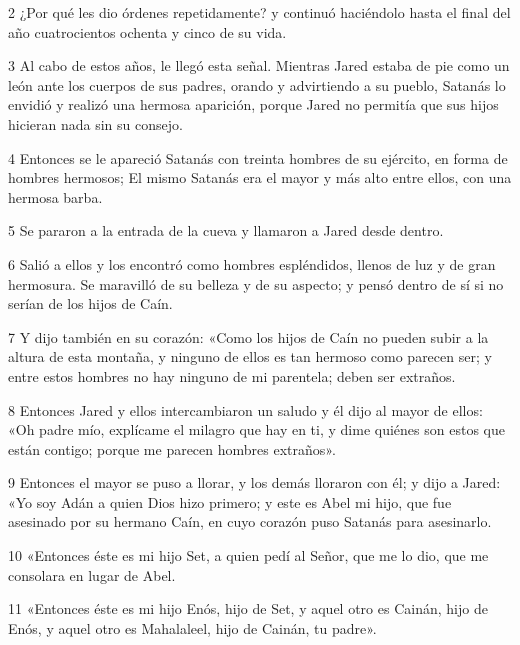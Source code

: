 \par 2 ¿Por qué les dio órdenes repetidamente? y continuó haciéndolo hasta el final del año cuatrocientos ochenta y cinco de su vida.

\par 3 Al cabo de estos años, le llegó esta señal. Mientras Jared estaba de pie como un león ante los cuerpos de sus padres, orando y advirtiendo a su pueblo, Satanás lo envidió y realizó una hermosa aparición, porque Jared no permitía que sus hijos hicieran nada sin su consejo.

\par 4 Entonces se le apareció Satanás con treinta hombres de su ejército, en forma de hombres hermosos; El mismo Satanás era el mayor y más alto entre ellos, con una hermosa barba.

\par 5 Se pararon a la entrada de la cueva y llamaron a Jared desde dentro.

\par 6 Salió a ellos y los encontró como hombres espléndidos, llenos de luz y de gran hermosura. Se maravilló de su belleza y de su aspecto; y pensó dentro de sí si no serían de los hijos de Caín.

\par 7 Y dijo también en su corazón: «Como los hijos de Caín no pueden subir a la altura de esta montaña, y ninguno de ellos es tan hermoso como parecen ser; y entre estos hombres no hay ninguno de mi parentela; deben ser extraños.

\par 8 Entonces Jared y ellos intercambiaron un saludo y él dijo al mayor de ellos: «Oh padre mío, explícame el milagro que hay en ti, y dime quiénes son estos que están contigo; porque me parecen hombres extraños».

\par 9 Entonces el mayor se puso a llorar, y los demás lloraron con él; y dijo a Jared: «Yo soy Adán a quien Dios hizo primero; y este es Abel mi hijo, que fue asesinado por su hermano Caín, en cuyo corazón puso Satanás para asesinarlo.

\par 10 «Entonces éste es mi hijo Set, a quien pedí al Señor, que me lo dio, que me consolara en lugar de Abel.

\par 11 «Entonces éste es mi hijo Enós, hijo de Set, y aquel otro es Cainán, hijo de Enós, y aquel otro es Mahalaleel, hijo de Cainán, tu padre».

